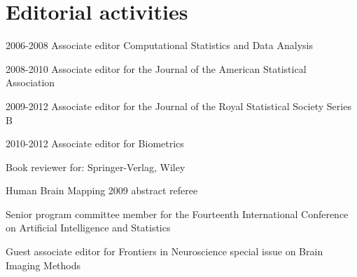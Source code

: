 \documentclass[12pt]{article}
\begin{document}
\section*{Editorial activities}
\begin{description}
\item 2006-2008 Associate editor Computational Statistics and Data Analysis
\item 2008-2010 Associate editor for the Journal of the American Statistical Association
\item 2009-2012 Associate editor for the Journal of the Royal Statistical Society
Series B
\item 2010-2012 Associate editor for Biometrics
\item Book reviewer for: Springer-Verlag, Wiley
\item Human Brain Mapping 2009 abstract referee
\item Senior program committee member for the Fourteenth International Conference on Artificial Intelligence and Statistics 
\item Guest associate editor for Frontiers in Neuroscience special issue
on Brain Imaging Methods
\end{description}
\end{document}
